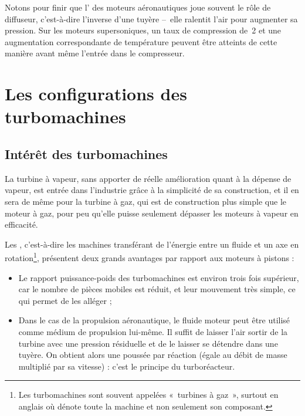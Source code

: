 		Notons pour finir que l’ des moteurs aéronautiques joue souvent le rôle de diffuseur, c’est-à-dire l’inverse d’une tuyère --\ elle ralentit l’air pour augmenter sa pression. Sur les moteurs supersoniques, un taux de compression de~2 et une augmentation correspondante de température peuvent être atteints de cette manière avant même l’entrée dans le compresseur.

\onlyframabook{\needspace{4cm}}%
\section{Les configurations des turbomachines}
\label{ch_configurations_turbomachines}


	\subsection{Intérêt des turbomachines}

			La turbine à vapeur, sans apporter de réelle amélioration quant à la dépense de vapeur, est entrée dans l’industrie grâce à la simplicité de sa construction, et il en sera de même pour la turbine à gaz, qui est de construction plus simple que le moteur à gaz, pour peu qu’elle puisse seulement dépasser les moteurs à vapeur en efficacité.

		Les , c’est-à-dire les machines transférant de l’énergie entre un fluide et un axe en rotation\footnote{Les turbomachines sont souvent appelées «~turbines à gaz~», surtout en anglais où  dénote toute la machine et non seulement son composant.}, présentent deux grands avantages par rapport aux moteurs à pistons :

		\begin{itemize}
			\item Le rapport puissance-poids des turbomachines est environ trois fois supérieur, car le nombre de pièces mobiles est réduit, et leur mouvement très simple, ce qui permet de les alléger ;
		\end{itemize} %
		
		\begin{itemize}
			\item Dans le cas de la propulsion aéronautique, le fluide moteur peut être utilisé comme médium de propulsion lui-même. Il suffit de laisser l’air sortir de la turbine avec une pression résiduelle et de le laisser se détendre dans une tuyère. On obtient alors une poussée par réaction (égale au débit de masse multiplié par sa vitesse) : c’est le principe du turboréacteur.
		\end{itemize}


